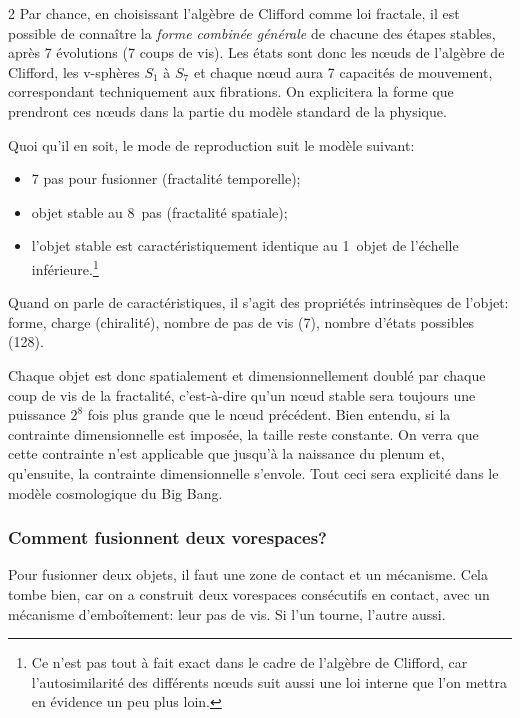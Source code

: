 \begin{multicols}{2}
Par chance, en choisissant l'algèbre de Clifford comme loi fractale,
il est possible de connaître la \textit{forme combinée générale} de chacune
des étapes stables, après 7 évolutions (7 coups de vis). Les états sont donc
les nœuds de l'algèbre de Clifford, les v-sphères $S_1$ à $S_7$ et chaque
nœud aura 7 capacités de mouvement, correspondant techniquement aux fibrations. On
explicitera la forme que prendront ces nœuds dans la partie du modèle standard
de la physique.
\medskip

Quoi qu'il en soit, le mode de reproduction suit le modèle suivant:

\begin{itemize}
	\item 7 pas pour fusionner (fractalité temporelle);
	\item objet stable au 8\ieme\ pas (fractalité spatiale);
	\item l'objet stable est caractéristiquement identique au 1\ier\ objet de
	l'échelle inférieure.\footnote{Ce n'est pas tout à fait exact dans le cadre de l'algèbre de Clifford, car l'autosimilarité des différents nœuds suit aussi une loi interne que l'on mettra en évidence un peu plus loin.} 
\end{itemize}


Quand on parle de caractéristiques, il s'agit des propriétés
intrinsèques de l'objet: forme, charge (chiralité), nombre de pas de
vis (7), nombre d'états possibles (128).

Chaque objet est donc spatialement et dimensionnellement doublé par
chaque coup de vis de la fractalité, c'est-à-dire qu'un nœud stable
sera toujours une puissance $2^8$ fois plus grande que le nœud précédent.
Bien entendu, si la contrainte dimensionnelle est imposée, la taille
reste constante. On verra que cette contrainte n'est applicable que
jusqu'à la naissance du plenum et, qu'ensuite, la contrainte
dimensionnelle s'envole. Tout ceci sera explicité dans le modèle
cosmologique du Big Bang.

 \subsubsection*{Comment fusionnent deux vorespaces?}

Pour fusionner deux objets, il faut une zone de contact et un
mécanisme. Cela tombe bien, car on a construit deux vorespaces
consécutifs en contact, avec un mécanisme d'emboîtement: leur pas
de vis. Si l'un tourne, l'autre aussi.


\end{multicols}
